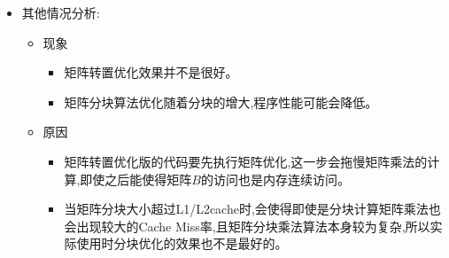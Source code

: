 \begin{itemize}
\begin{itemize}
        \item 现象:WSL宿主机上的运行时间比QEMU低约2各数量级;WSL 环境下的曲线更为平稳且符合理论预期;QEMU 下的曲线存在细微波动，且在处理超大规模矩阵时会出现系统调用报错或计时器延迟。
        \item 原因:QEMU 作为系统级模拟器，需要将每一条 RISC-V 指令动态翻译为 x86 指令执行，这带来了巨大的软件模拟损耗。同时宿主机拥有真实的硬件缓存和预取器（L1d 288KB），而 QEMU 的缓存层级是软件定义的，无法完美重现硬件级别的访存延迟。
    \end{itemize}
    \item 其他情况分析:
    \begin{itemize}
        \item 现象
        \begin{itemize}
            \item 矩阵转置优化效果并不是很好。
            \item 矩阵分块算法优化随着分块的增大,程序性能可能会降低。
        \end{itemize}
        \item 原因
        \begin{itemize}
            \item 矩阵转置优化版的代码要先执行矩阵优化,这一步会拖慢矩阵乘法的计算,即使之后能使得矩阵$B$的访问也是内存连续访问。
            \item 当矩阵分块大小超过L1/L2cache时,会使得即使是分块计算矩阵乘法也会出现较大的Cache Miss率,且矩阵分块乘法算法本身较为复杂,所以实际使用时分块优化的效果也不是最好的。
        \end{itemize}
        
    \end{itemize}

\end{itemize}
